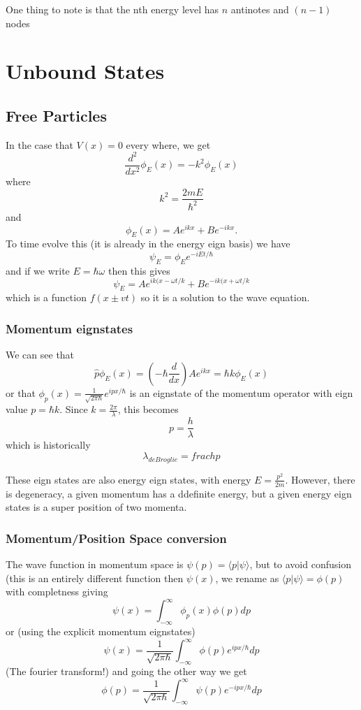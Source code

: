 \documentclass{homework}
\newcommand{\kt}{\rangle}
\newcommand{\bra}[1]{ \langle #1 |}
\begin{document}
One thing to note is that the nth energy level has $n$ antinotes and $(n-1)$ nodes


\section{Unbound States}

\subsection{Free Particles}

In the case that $V(x) = 0$ every where, we get
\[\frac{d^2}{dx^2}\phi_E(x) = -k^2 \phi_E(x)\]
where 
\[k^2 = \frac{2mE}{\hbar^2}\]
and 
\[\phi_E(x) = Ae^{ikx}+Be^{-ikx}.\]
To time evolve this (it is already in the energy eign basis) we have
\[\psi_E = \phi_E e^{-iEt/\hbar}\]
and if we write $E = \hbar \omega$ then this gives
\[\psi_E = Ae^{ik(x - \omega t/k} + Be^{-ik(x + \omega t/k}\]
which is a function $f(x \pm vt)$ so it is a solution to the wave equation.

\subsubsection{Momentum eignstates}

We can see that
\[\hat{p}\phi_E (x) = (-\hbar\frac{d}{dx})Ae^{ikx} = \hbar k \phi_E (x)\]
or that $\phi_p (x) = \frac{1}{\sqrt{2\pi\hbar}}e^{ipx/\hbar}$ is an eignstate of the momentum operator with eign value $p = \hbar k$. Since $k = \frac{2\pi}{\lambda}$, this becomes
\[p = \frac{h}{\lambda}\]
which is historically
\[\lambda_{de Broglie} = frac{h}{p}\]

These eign states are also energy eign states, with energy $E = \frac{p^2}{2m}$. However, there is degeneracy, a given momentum has a ddefinite energy, but a given energy eign states is a super position of two momenta. 

\subsubsection{Momentum/Position Space conversion}

The wave function in momentum space is $\psi(p) = \bra{p}\psi \kt$, but to avoid confusion (this is an entirely different function then $\psi(x)$, we rename as $\bra{p}\psi \kt = \phi(p)$ with completness giving
\[\psi(x) = \int_{-\infty}^{\infty}\phi_p(x)\phi(p)dp\]
or (using the explicit momentum eignstates)
\[\psi(x) = \frac{1}{\sqrt{2\pi \hbar}}\int_{-\infty}^{\infty}\phi(p)e^{ipx/\hbar}dp\]
(The fourier transform!) and going the other way we get
\[\phi(p) = \frac{1}{\sqrt{2\pi \hbar}}\int_{-\infty}^{\infty}\psi(p)e^{-ipx/\hbar}dp\]
\end{document}

